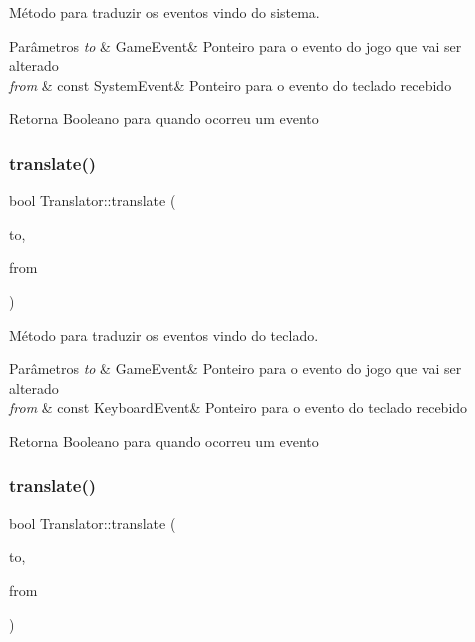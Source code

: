 Método para traduzir os eventos vindo do sistema. 


\begin{DoxyParams}{Parâmetros}
{\em to} & Game\+Event\& Ponteiro para o evento do jogo que vai ser alterado \\
\hline
{\em from} & const System\+Event\& Ponteiro para o evento do teclado recebido \\
\hline
\end{DoxyParams}
\begin{DoxyReturn}{Retorna}
Booleano para quando ocorreu um evento 
\end{DoxyReturn}
\mbox{\label{classTranslator_a23fe703107ba6e3b26e5da8e9f28777a}} 
\subsubsection{\texorpdfstring{translate()}{translate()}\hspace{0.1cm}{\footnotesize\ttfamily [3/4]}}
{\footnotesize\ttfamily bool Translator\+::translate (\begin{DoxyParamCaption}\item[{Game\+Event \&}]{to,  }\item[{const Keyboard\+Event \&}]{from }\end{DoxyParamCaption})\hspace{0.3cm}{\ttfamily [virtual]}}



Método para traduzir os eventos vindo do teclado. 


\begin{DoxyParams}{Parâmetros}
{\em to} & Game\+Event\& Ponteiro para o evento do jogo que vai ser alterado \\
\hline
{\em from} & const Keyboard\+Event\& Ponteiro para o evento do teclado recebido \\
\hline
\end{DoxyParams}
\begin{DoxyReturn}{Retorna}
Booleano para quando ocorreu um evento 
\end{DoxyReturn}
\mbox{\label{classTranslator_ad75df11a67688dba45a23cecc9930970}} 
\subsubsection{\texorpdfstring{translate()}{translate()}\hspace{0.1cm}{\footnotesize\ttfamily [4/4]}}
{\footnotesize\ttfamily bool Translator\+::translate (\begin{DoxyParamCaption}\item[{Game\+Event \&}]{to,  }\item[{const Joystick\+Event \&}]{from }\end{DoxyParamCaption})}



